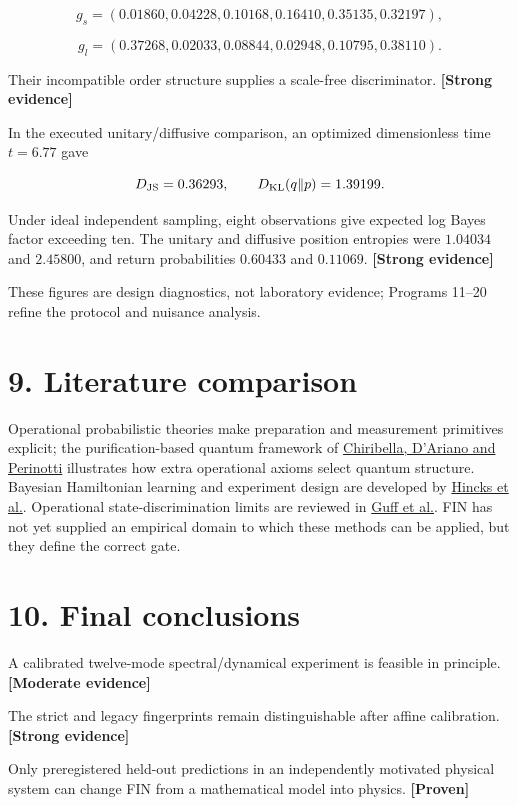 \documentclass[11pt,a4paper,openany]{report}
\newcommand{\statusProven}{\textcolor{fingreen}{[Proven]}}
\newcommand{\statusStrong}{\textcolor{finblue}{[Strong evidence]}}
\newcommand{\statusModerate}{\textcolor{finviolet}{[Moderate evidence]}}
\begin{document}
\[
g_s=(0.01860,0.04228,0.10168,0.16410,0.35135,0.32197),
\]

\[
g_l=(0.37268,0.02033,0.08844,0.02948,0.10795,0.38110).
\]

Their incompatible order structure supplies a scale-free discriminator. \textbf{\statusStrong{}}

In the executed unitary/\allowbreak{}diffusive comparison, an optimized dimensionless time \(t=6.77\) gave

\[
D_{\rm JS}=0.36293,\qquad
D_{\rm KL}(q\|p)=1.39199.
\]

Under ideal independent sampling, eight observations give expected log Bayes factor exceeding ten. The unitary and diffusive position entropies were \(1.04034\) and \(2.45800\), and return probabilities \(0.60433\) and \(0.11069\). \textbf{\statusStrong{}}

These figures are design diagnostics, not laboratory evidence; Programs 11–20 refine the protocol and nuisance analysis.

\section{9. Literature comparison}

Operational probabilistic theories make preparation and measurement primitives explicit; the purification-based quantum framework of \href{https://arxiv.org/abs/0908.1583}{Chiribella, D'Ariano and Perinotti} illustrates how extra operational axioms select quantum structure. Bayesian Hamiltonian learning and experiment design are developed by \href{https://arxiv.org/abs/1806.02427}{Hincks et al.}. Operational state-discrimination limits are reviewed in \href{https://arxiv.org/abs/1906.09737}{Guff et al.}. FIN has not yet supplied an empirical domain to which these methods can be applied, but they define the correct gate.

\section{10. Final conclusions}

A calibrated twelve-mode spectral/\allowbreak{}dynamical experiment is feasible in principle. \textbf{\statusModerate{}}

The strict and legacy fingerprints remain distinguishable after affine calibration. \textbf{\statusStrong{}}

Only preregistered held-out predictions in an independently motivated physical system can change FIN from a mathematical model into physics. \textbf{\statusProven{}}
\end{document}
